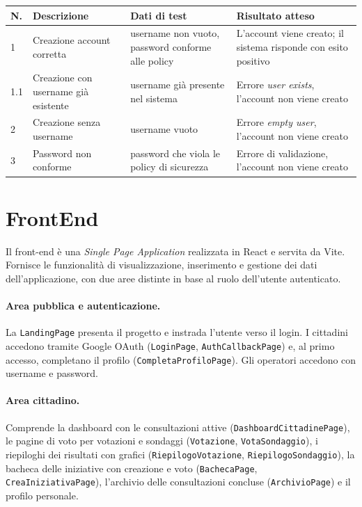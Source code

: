 \documentclass{article}
\newcommand{\code}[1]{\texttt{\small #1}}
\begin{document}
\renewcommand{\arraystretch}{1.3}
\begin{longtable}{L{0.8cm} L{3.4cm} L{3cm} L{4.5cm}}
	\toprule
	\textbf{N.} & \textbf{Descrizione} & \textbf{Dati di test} & \textbf{Risultato atteso} \\
	\midrule
	 & Creazione account corretta & username non vuoto, password conforme alle policy &
	L'account viene creato; il sistema risponde con esito positivo \\
	1.1 & Creazione con username già esistente & username già presente nel sistema &
	Errore \textit{user exists}, l'account non viene creato \\
	2 & Creazione senza username & username vuoto &
	Errore \textit{empty user}, l'account non viene creato \\
	3 & Password non conforme & password che viola le policy di sicurezza &
	Errore di validazione, l'account non viene creato \\
	\bottomrule
\end{longtable}

\section{FrontEnd}

Il front-end è una \textit{Single Page Application} realizzata in React e servita da Vite.
Fornisce le funzionalità di visualizzazione, inserimento e gestione dei dati
dell'applicazione, con due aree distinte in base al ruolo dell'utente autenticato.

\paragraph{Area pubblica e autenticazione.}
La \code{LandingPage} presenta il progetto e instrada l'utente verso il login. I cittadini
accedono tramite Google OAuth (\code{LoginPage}, \code{AuthCallbackPage}) e, al primo accesso,
completano il profilo (\code{CompletaProfiloPage}). Gli operatori accedono con
username e password.

\paragraph{Area cittadino.}
Comprende la dashboard con le consultazioni attive
(\code{DashboardCittadinePage}), le pagine di voto per votazioni e sondaggi
(\code{Votazione}, \code{VotaSondaggio}), i riepiloghi dei risultati con grafici
(\code{RiepilogoVotazione}, \code{RiepilogoSondaggio}), la bacheca delle iniziative con
creazione e voto (\code{BachecaPage}, \code{CreaIniziativaPage}), l'archivio delle
consultazioni concluse (\code{ArchivioPage}) e il profilo personale.
\end{document}
